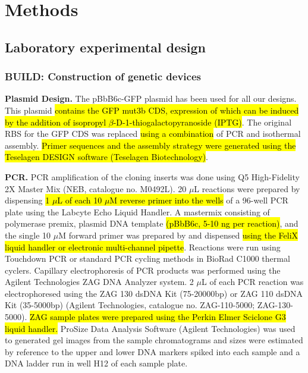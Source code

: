 \section{Methods}

\subsection{Laboratory experimental design}

\subsubsection{BUILD: Construction of genetic devices}

\textbf{Plasmid Design.}
The pBbB6c-GFP plasmid has been used for all our designs.
This plasmid \hl{contains the GFP mut3b CDS, expression of which can be induced by the addition of isopropyl $\beta$-D-1-thiogalactopyranoside (IPTG)}.
The original RBS for the GFP CDS was replaced \hl{using a combination} of PCR and isothermal assembly.
\hl{Primer sequences and the assembly strategy were generated using the Teselagen DESIGN software (Teselagen Biotechnology)}.

\textbf{PCR.}
PCR amplification of the cloning inserts was done using Q5 High-Fidelity 2X Master Mix (NEB, catalogue no. M0492L).
20 $\mu$L reactions were prepared by dispensing \hl{1 $\mu$L of each 10 $\mu$M reverse primer into the wells} of a 96-well PCR plate using the Labcyte Echo Liquid Handler.
A mastermix consisting of polymerase premix, plasmid DNA template \hl{(pBbB6c, 5-10 ng per reaction)}, and the single 10 $\mu$M forward primer was prepared by and dispensed \hl{using the FeliX liquid handler or electronic multi-channel pipette}. Reactions were run using Touchdown PCR or standard PCR cycling methods in BioRad C1000 thermal cyclers.
Capillary electrophoresis of PCR products was performed using the Agilent Technologies ZAG DNA Analyzer system.
2 $\mu$L of each PCR reaction was electrophoresed using the ZAG 130 dsDNA Kit (75-20000bp) or ZAG 110 dsDNA Kit (35-5000bp) (Agilent Technologies, catalogue no. ZAG-110-5000; ZAG-130-5000). \hl{ZAG sample plates were prepared using the Perkin Elmer Sciclone G3 liquid handler.}
ProSize Data Analysis Software (Agilent Technologies) was used to generated gel images from the sample chromatograms and sizes were estimated by reference to the upper and lower DNA markers spiked into each sample and a DNA ladder run in well H12 of each sample plate.

